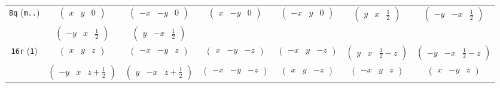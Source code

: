 \documentclass[fleqn,9pt,landscape]{jsarticle}
\begin{document}
\begin{center}
\begin{longtable}{ccccccc}
{\tt 8q} ({\tt m..}) & $ \begin{pmatrix} x & y & 0 \end{pmatrix} $ & $ \begin{pmatrix} - x & - y & 0 \end{pmatrix} $ & $ \begin{pmatrix} x & - y & 0 \end{pmatrix} $ & $ \begin{pmatrix} - x & y & 0 \end{pmatrix} $ & $ \begin{pmatrix} y & x & \frac{1}{2} \end{pmatrix} $ & $ \begin{pmatrix} - y & - x & \frac{1}{2} \end{pmatrix} $ \\
& $ \begin{pmatrix} - y & x & \frac{1}{2} \end{pmatrix} $ & $ \begin{pmatrix} y & - x & \frac{1}{2} \end{pmatrix} $ & $  $ & $  $ & $  $ & $  $ \\ \hline
{\tt 16r} ({\tt 1}) & $ \begin{pmatrix} x & y & z \end{pmatrix} $ & $ \begin{pmatrix} - x & - y & z \end{pmatrix} $ & $ \begin{pmatrix} x & - y & - z \end{pmatrix} $ & $ \begin{pmatrix} - x & y & - z \end{pmatrix} $ & $ \begin{pmatrix} y & x & \frac{1}{2} - z \end{pmatrix} $ & $ \begin{pmatrix} - y & - x & \frac{1}{2} - z \end{pmatrix} $ \\
& $ \begin{pmatrix} - y & x & z + \frac{1}{2} \end{pmatrix} $ & $ \begin{pmatrix} y & - x & z + \frac{1}{2} \end{pmatrix} $ & $ \begin{pmatrix} - x & - y & - z \end{pmatrix} $ & $ \begin{pmatrix} x & y & - z \end{pmatrix} $ & $ \begin{pmatrix} - x & y & z \end{pmatrix} $ & $ \begin{pmatrix} x & - y & z \end{pmatrix} $ \\

\end{longtable}
\end{center}
\end{document}
